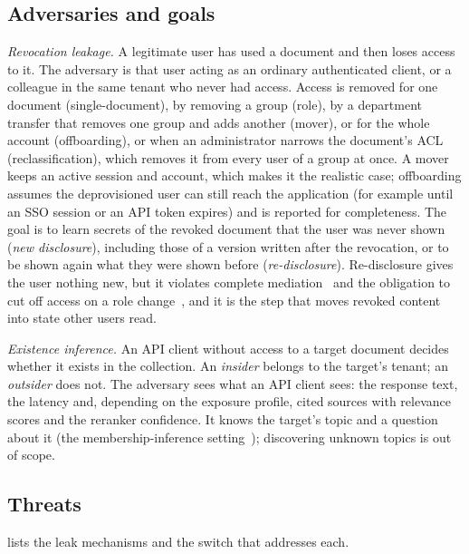 \subsection{Adversaries and goals}
\emph{Revocation leakage.} A legitimate user has used a document and then loses access to it. The
adversary is that user acting as an ordinary authenticated client, or a colleague in the same
tenant who never had access. Access is removed for one document (single-document), by removing a
group (role), by a department transfer that removes one group and adds another (mover), or for the
whole account (offboarding), or when an administrator narrows the document's ACL
(reclassification), which removes it from every user of a group at once. A mover keeps an active session and account, which makes it the
realistic case; offboarding assumes the deprovisioned user can still reach the application (for
example until an SSO session or an API token expires) and is reported for completeness. The goal
is to learn secrets of the revoked document that the user was never shown (\emph{new disclosure}),
including those of a version written after the revocation, or to be shown again what they were
shown before (\emph{re-disclosure}). Re-disclosure gives the user nothing new, but it violates
complete mediation~\cite{saltzer1975protection} and the obligation to cut off access on a role
change~\cite{nist80053r5}, and it is the step that moves revoked content into state other users
read.

\emph{Existence inference.} An API client without access to a target document decides whether it
exists in the collection. An \emph{insider} belongs to the target's tenant; an \emph{outsider} does
not. The adversary sees what an API client sees: the response text, the latency and, depending on
the exposure profile, cited sources with relevance scores and the reranker confidence. It knows the
target's topic and a question about it (the membership-inference setting~\cite{shokri2017membership});
discovering unknown topics is out of scope.

\subsection{Threats}
 lists the leak mechanisms and the switch that addresses each.

